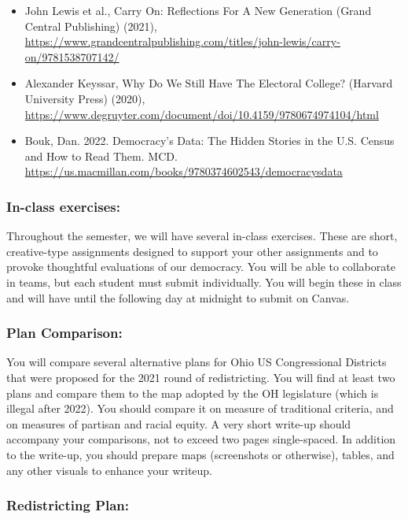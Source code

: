 \documentclass[
]{article}
\begin{document}
\begin{itemize}
  (2022),
  \url{https://www.haymarketbooks.org/books/1546-abolition-feminism-now}
\item
  John Lewis et al., Carry On: Reflections For A New Generation (Grand
  Central Publishing) (2021),
  \url{https://www.grandcentralpublishing.com/titles/john-lewis/carry-on/9781538707142/}
\item
  Alexander Keyssar, Why Do We Still Have The Electoral College?
  (Harvard University Press) (2020),
  \url{https://www.degruyter.com/document/doi/10.4159/9780674974104/html}
\item
  Bouk, Dan. 2022. Democracy's Data: The Hidden Stories in the U.S.
  Census and How to Read Them. MCD.
  \url{https://us.macmillan.com/books/9780374602543/democracysdata}
\end{itemize}

\hypertarget{in-class-exercises}{%
\subsubsection{In-class exercises:}\label{in-class-exercises}}

Throughout the semester, we will have several in-class exercises. These
are short, creative-type assignments designed to support your other
assignments and to provoke thoughtful evaluations of our democracy. You
will be able to collaborate in teams, but each student must submit
individually. You will begin these in class and will have until the
following day at midnight to submit on Canvas.

\hypertarget{plan-comparison}{%
\subsubsection{Plan Comparison:}\label{plan-comparison}}

You will compare several alternative plans for Ohio US Congressional
Districts that were proposed for the 2021 round of redistricting. You
will find at least two plans and compare them to the map adopted by the
OH legislature (which is illegal after 2022). You should compare it on
measure of traditional criteria, and on measures of partisan and racial
equity. A very short write-up should accompany your comparisons, not to
exceed two pages single-spaced. In addition to the write-up, you should
prepare maps (screenshots or otherwise), tables, and any other visuals
to enhance your writeup.

\hypertarget{redistricting-plan}{%
\subsubsection{Redistricting Plan:}\label{redistricting-plan}}
\end{document}
